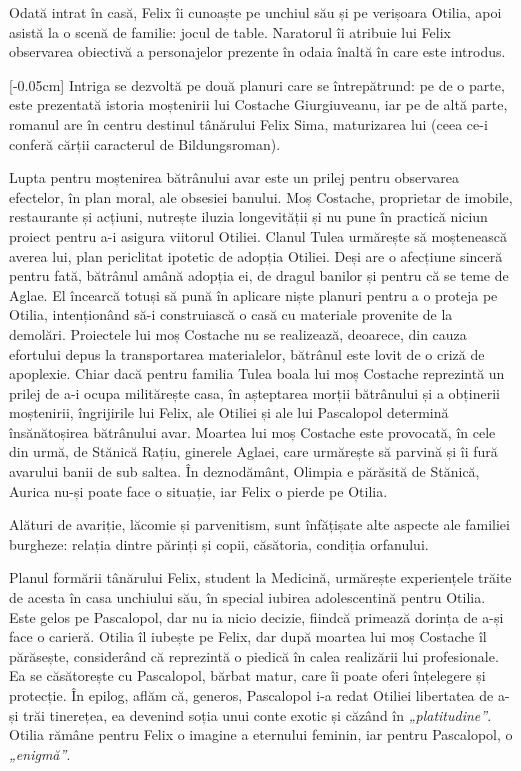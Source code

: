 Odată intrat în casă, Felix îi cunoaște pe unchiul său și pe verișoara Otilia, apoi asistă la o scenă de familie: jocul de table. Naratorul îi atribuie lui Felix observarea obiectivă a personajelor prezente în odaia înaltă în care este introdus.

[-0.05cm]
Intriga se dezvoltă pe două planuri care se întrepătrund: pe de o parte, este prezentată istoria moștenirii lui Costache Giurgiuveanu, iar pe de altă parte, romanul are în centru destinul tânărului Felix Sima, maturizarea lui (ceea ce-i conferă cărții caracterul de Bildungsroman).

Lupta pentru moștenirea bătrânului avar este un prilej pentru observarea efectelor, în plan moral, ale obsesiei banului. Moș Costache, proprietar de imobile, restaurante și acțiuni, nutrește iluzia longevității și nu pune în practică niciun proiect pentru a-i asigura viitorul Otiliei. Clanul Tulea urmărește să moștenească averea lui, plan periclitat ipotetic de adopția Otiliei. Deși are o afecțiune sinceră pentru fată, bătrânul amână adopția ei, de dragul banilor și pentru că se teme de Aglae. El încearcă totuși să pună în aplicare niște planuri pentru a o proteja pe Otilia, intenționând să-i construiască o casă cu materiale provenite de la demolări. Proiectele lui moș Costache nu se realizează, deoarece, din cauza efortului depus la transportarea materialelor, bătrânul este lovit de o criză de apoplexie. Chiar dacă pentru familia Tulea boala lui moș Costache reprezintă un prilej de a-i ocupa militărește casa, în așteptarea morții bătrânului și a obținerii moștenirii, îngrijirile lui Felix, ale Otiliei și ale lui Pascalopol determină însănătoșirea bătrânului avar. Moartea lui moș Costache este provocată, în cele din urmă, de Stănică Rațiu, ginerele Aglaei, care urmărește să parvină și îi fură avarului banii de sub saltea. În deznodământ, Olimpia e părăsită de Stănică, Aurica nu-și poate face o situație, iar Felix o pierde pe Otilia.

Alături de avariție, lăcomie și parvenitism, sunt înfățișate alte aspecte ale familiei burgheze: relația dintre părinți și copii, căsătoria, condiția orfanului.

Planul formării tânărului Felix, student la Medicină, urmărește experiențele trăite de acesta în casa unchiului său, în special iubirea adolescentină pentru Otilia. Este gelos pe Pascalopol, dar nu ia nicio decizie, fiindcă primează dorința de a-și face o carieră. Otilia îl iubește pe Felix, dar după moartea lui moș Costache îl părăsește, considerând că reprezintă o piedică în calea realizării lui profesionale. Ea se căsătorește cu Pascalopol, bărbat matur, care îi poate oferi înțelegere și protecție. În epilog, aflăm că, generos, Pascalopol i-a redat Otiliei libertatea de a-și trăi tinerețea, ea devenind soția unui conte exotic și căzând în \textit{„platitudine”}. Otilia rămâne pentru Felix o imagine a eternului feminin, iar pentru Pascalopol, o \textit{„enigmă”}.


